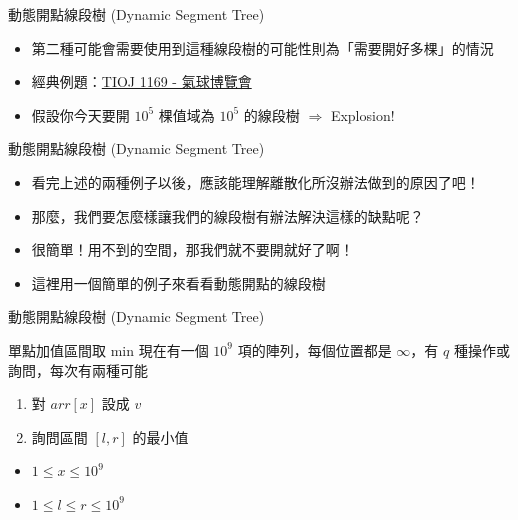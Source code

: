 \documentclass[aspectratio=169]{beamer}
\begin{document}
    \begin{frame}{動態開點線段樹 (Dynamic Segment Tree)}
        \begin{itemize}
            \item 第二種可能會需要使用到這種線段樹的可能性則為「需要開好多棵」的情況
            \item 經典例題：\href{https://tioj.ck.tp.edu.tw/problems/1169}{TIOJ 1169 - 氣球博覽會}
            \item 假設你今天要開 $10^5$ 棵值域為 $10^5$ 的線段樹 $\Rightarrow$ Explosion!
        \end{itemize}
    \end{frame}

    \begin{frame}{動態開點線段樹 (Dynamic Segment Tree)}
        \begin{itemize}
            \item 看完上述的兩種例子以後，應該能理解離散化所沒辦法做到的原因了吧！
            \item 那麼，我們要怎麼樣讓我們的線段樹有辦法解決這樣的缺點呢？
            \item<2-> 很簡單！用不到的空間，那我們就不要開就好了啊！
            \item<3-> 這裡用一個簡單的例子來看看動態開點的線段樹
        \end{itemize}
    \end{frame}

    \begin{frame}{動態開點線段樹 (Dynamic Segment Tree)}
        \begin{block}{單點加值區間取 min}
            現在有一個 $10^9$ 項的陣列，每個位置都是 $\infty$，有 $q$ 種操作或詢問，每次有兩種可能
            \begin{enumerate}
                \item 對 $arr[x]$ 設成 $v$
                \item 詢問區間 $[l,r]$ 的最小值
            \end{enumerate}
            \vspace{0.5cm}
            \begin{itemize}
                \item $1 \le x \le 10^9$
                \item $1 \le l \le r \le 10^9$
            \end{itemize}
        \end{block}
    \end{frame}
\end{document}
